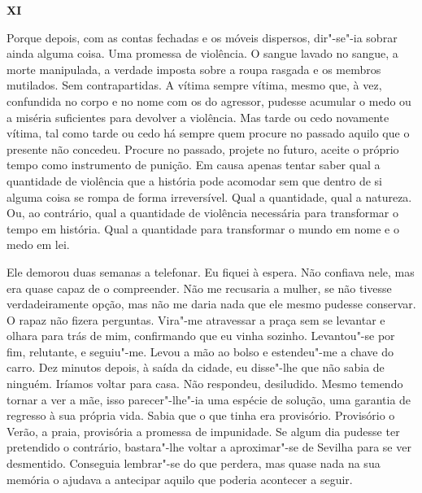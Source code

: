 \vspace*{1.8cm}
\noindent{}\textbf{XI}

\bigskip

Porque depois, com as contas fechadas e os móveis dispersos, dir"-se"-ia
sobrar ainda alguma coisa. Uma promessa de violência. O sangue lavado no
sangue, a morte manipulada, a verdade imposta sobre a roupa rasgada e os
membros mutilados. Sem contrapartidas. A vítima sempre vítima, mesmo
que, à vez, confundida no corpo e no nome com os do agressor, pudesse
acumular o medo ou a miséria suficientes para devolver a violência. Mas
tarde ou cedo novamente vítima, tal como tarde ou cedo há sempre quem
procure no passado aquilo que o presente não concedeu. Procure no
passado, projete no futuro, aceite o próprio tempo como instrumento de
punição. Em causa apenas tentar saber qual a quantidade de violência que
a história pode acomodar sem que dentro de si alguma coisa se rompa de
forma irreversível. Qual a quantidade, qual a natureza. Ou, ao
contrário, qual a quantidade de violência necessária para transformar o
tempo em história. Qual a quantidade para transformar o mundo em nome e
o medo em lei.

Ele demorou duas semanas a telefonar. Eu fiquei à espera. Não confiava
nele, mas era quase capaz de o compreender. Não me recusaria a mulher,
se não tivesse verdadeiramente opção, mas não me daria nada que ele
mesmo pudesse conservar. O rapaz não fizera perguntas. Vira"-me
atravessar a praça sem se levantar e olhara para trás de mim,
confirmando que eu vinha sozinho. Levantou"-se por fim, relutante, e
seguiu"-me. Levou a mão ao bolso e estendeu"-me a chave do carro. Dez
minutos depois, à saída da cidade, eu disse"-lhe que não sabia de
ninguém. Iríamos voltar para casa. Não respondeu, desiludido. Mesmo
temendo tornar a ver a mãe, isso parecer"-lhe"-ia uma espécie de
solução, uma garantia de regresso à sua própria vida. Sabia que o que
tinha era provisório. Provisório o Verão, a praia, provisória a promessa
de impunidade. Se algum dia pudesse ter pretendido o contrário,
bastara"-lhe voltar a aproximar"-se de Sevilha para se ver desmentido.
Conseguia lembrar"-se do que perdera, mas quase nada na sua memória o
ajudava a antecipar aquilo que poderia acontecer a seguir.

